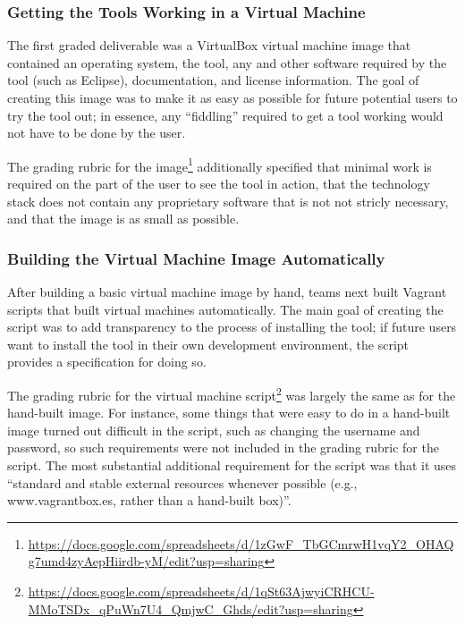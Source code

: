 \documentclass[10pt,conference]{IEEEtran}
\begin{document}
\subsubsection{Getting the Tools Working in a Virtual Machine}

The first graded deliverable was a VirtualBox virtual machine
image that contained an operating system, the tool, any
and other software required by the tool (such as Eclipse),
documentation, and license information.
The goal of creating this image was to make it as
easy as possible for future potential users to try
the tool out; in essence, any ``fiddling'' required to get
a tool working would not have to be done by the user.

The grading rubric for the image\footnote{\url{https://docs.google.com/spreadsheets/d/1zGwF_TbGCmrwH1vqY2_OHAQg7umd4zyAepHiirdb-yM/edit?usp=sharing}}
additionally specified that minimal work is required
on the part of the user to see the tool in action,
that the technology stack does not contain any proprietary 
software that is not not stricly necessary,
and that the image is as small as possible.


\subsubsection{Building the Virtual Machine Image Automatically}

After building a basic virtual machine image by hand,
teams next built Vagrant scripts that built virtual machines
automatically.
The main goal of creating the script was to add 
transparency to the process
of installing the tool; if future users want to install the tool
in their own development environment, the script provides a
specification for doing so.

The grading rubric for the virtual machine 
script\footnote{\url{https://docs.google.com/spreadsheets/d/1qSt63AjwyiCRHCU-MMoTSDx_qPuWn7U4_QmjwC_Ghds/edit?usp=sharing}}
was largely the same as for the hand-built image.
For instance, some things that were easy to do in a hand-built 
image turned out difficult in the script, such as changing 
the username and password, so such requirements were 
not included in the grading rubric for the script.
The most substantial additional requirement for the script
was that it uses ``standard and stable external resources 
whenever possible (e.g., www.vagrantbox.es, rather than a 
hand-built box)''.
\end{document}
